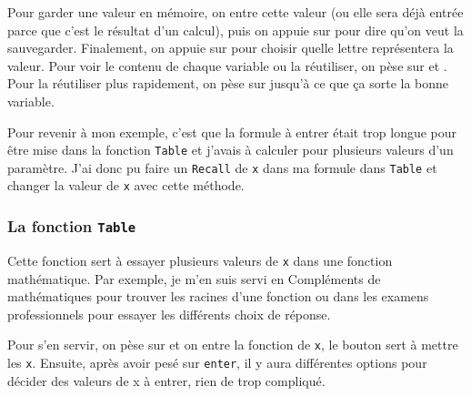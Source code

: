 Pour garder une valeur en mémoire, on entre cette valeur (ou elle sera déjà entrée parce que c'est le résultat d'un calcul), puis on appuie sur  pour dire qu'on veut la sauvegarder. Finalement, on appuie sur  pour choisir quelle lettre représentera la valeur. Pour voir le contenu de chaque variable ou la réutiliser, on pèse sur  et . Pour la réutiliser plus rapidement, on pèse sur  jusqu'à ce que ça sorte la bonne variable.

Pour revenir à mon exemple, c'est que la formule à entrer était trop longue pour être mise dans la fonction \texttt{Table} et j'avais à calculer pour plusieurs valeurs d'un paramètre. J'ai donc pu faire un \texttt{Recall} de \texttt{x} dans ma formule dans \texttt{Table} et changer la valeur de \texttt{x} avec cette méthode.

\subsubsection{La fonction \texttt{Table}}
Cette fonction sert à essayer plusieurs valeurs de \texttt{x} dans une fonction mathématique. Par exemple, je m'en suis servi en Compléments de mathématiques pour trouver les racines d'une fonction ou dans les examens professionnels pour essayer les différents choix de réponse. 

Pour s'en servir, on pèse sur  et on entre la fonction de \texttt{x}, le bouton  sert à mettre les \texttt{x}. Ensuite, après avoir pesé sur \texttt{enter}, il y aura différentes options pour décider des valeurs de x à entrer, rien de trop compliqué.

